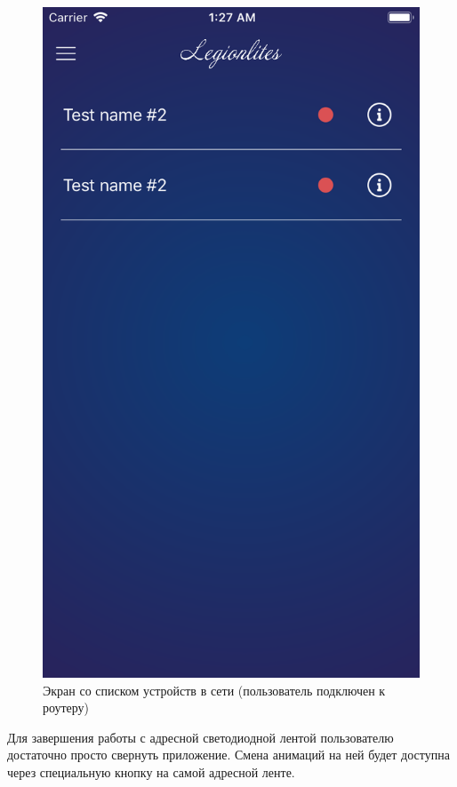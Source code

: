 \begin{figure}[H]
\centering
	\includegraphics[scale=0.2]{figures/userGuide/deviceList.png}
	\caption{Экран со списком устройств в сети (пользователь подключен к роутеру)}
	\label{fig:develop:userGuide:device}
\end{figure}

Для завершения работы с адресной светодиодной лентой пользователю достаточно просто свернуть приложение. Смена анимаций на ней будет доступна через специальную кнопку на самой адресной ленте.


